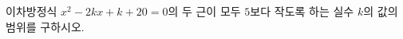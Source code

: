 \hspace*{2mm}\begin{minipage}[t]{\dimexpr\linewidth-2mm\relax}\vspace{0pt}
이차방정식 $x^2-2kx+k+20=0$의 두 근이 모두 $5$보다 작도록 하는 실수 $k$의 값의 범위를 구하시오.\end{minipage}
